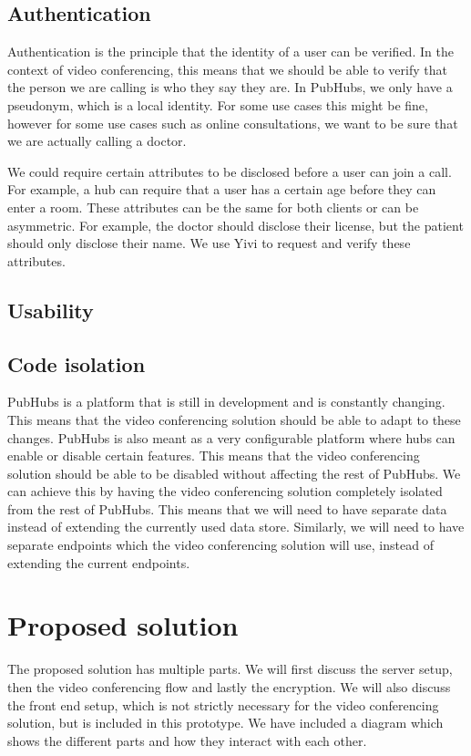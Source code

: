 \documentclass{report}
\begin{document}
\section{Authentication}
Authentication is the principle that the identity of a user can be verified. In the context of video conferencing,
this means that we should be able to verify that the person we are calling is who they say they are. In PubHubs, we
only have a pseudonym, which is a local identity. For some use cases this might be fine, however for some use cases
such as online consultations, we want to be sure that we are actually calling a doctor.

We could require certain attributes to be disclosed before a user can join a call. For example, a hub
can require that a user has a certain age before they can enter a room. These attributes can be the same for both
clients or can be asymmetric. For example, the doctor should disclose their license, but the patient should only
disclose their name. We use Yivi to request and verify these attributes.

\section{Usability}

\section{Code isolation}
PubHubs is a platform that is still in development and is constantly changing. This means that the video
conferencing solution should be able to adapt to these changes. PubHubs is also meant as a very configurable platform
where hubs can enable or disable certain features. This means that the video conferencing solution should be able to
be disabled without affecting the rest of PubHubs. We can achieve this by having the video conferencing solution
completely isolated from the rest of PubHubs. This means that we will need to have separate data instead of
extending the currently used data store. Similarly, we will need to have separate endpoints which the video
conferencing solution will use, instead of extending the current endpoints.

\chapter{Proposed solution}
The proposed solution has multiple parts. We will first discuss the server setup, then the video conferencing flow
and lastly the encryption. We will also discuss the front end setup, which is not strictly necessary for the video
conferencing solution, but is included in this prototype. We have included a diagram which shows the different parts
and how they interact with each other.
\end{document}
